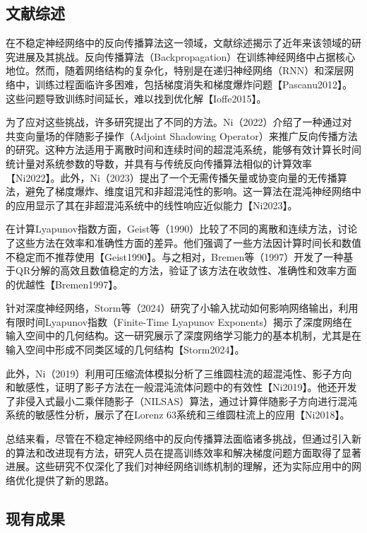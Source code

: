 \documentclass[12pt,a4paper]{amsart}
\begin{document}
\subsection{文献综述}

在不稳定神经网络中的反向传播算法这一领域，文献综述揭示了近年来该领域的研究进展及其挑战。反向传播算法（Backpropagation）在训练神经网络中占据核心地位。然而，随着网络结构的复杂化，特别是在递归神经网络（RNN）和深层网络中，训练过程面临许多困难，包括梯度消失和梯度爆炸问题【Pascanu2012】。这些问题导致训练时间延长，难以找到优化解【Ioffe2015】。

为了应对这些挑战，许多研究提出了不同的方法。Ni（2022）介绍了一种通过对共变向量场的伴随影子操作（Adjoint Shadowing Operator）来推广反向传播方法的研究。这种方法适用于离散时间和连续时间的超混沌系统，能够有效计算长时间统计量对系统参数的导数，并具有与传统反向传播算法相似的计算效率【Ni2022】。此外，Ni（2023）提出了一个无需传播矢量或协变向量的无传播算法，避免了梯度爆炸、维度诅咒和非超混沌性的影响。这一算法在混沌神经网络中的应用显示了其在非超混沌系统中的线性响应近似能力【Ni2023】。

在计算Lyapunov指数方面，Geist等（1990）比较了不同的离散和连续方法，讨论了这些方法在效率和准确性方面的差异。他们强调了一些方法因计算时间长和数值不稳定而不推荐使用【Geist1990】。与之相对，Bremen等（1997）开发了一种基于QR分解的高效且数值稳定的方法，验证了该方法在收敛性、准确性和效率方面的优越性【Bremen1997】。

针对深度神经网络，Storm等（2024）研究了小输入扰动如何影响网络输出，利用有限时间Lyapunov指数（Finite-Time Lyapunov Exponents）揭示了深度网络在输入空间中的几何结构。这一研究展示了深度网络学习能力的基本机制，尤其是在输入空间中形成不同类区域的几何结构【Storm2024】。

此外，Ni（2019）利用可压缩流体模拟分析了三维圆柱流的超混沌性、影子方向和敏感性，证明了影子方法在一般混沌流体问题中的有效性【Ni2019】。他还开发了非侵入式最小二乘伴随影子（NILSAS）算法，通过计算伴随影子方向进行混沌系统的敏感性分析，展示了在Lorenz 63系统和三维圆柱流上的应用【Ni2018】。

总结来看，尽管在不稳定神经网络中的反向传播算法面临诸多挑战，但通过引入新的算法和改进现有方法，研究人员在提高训练效率和解决梯度问题方面取得了显著进展。这些研究不仅深化了我们对神经网络训练机制的理解，还为实际应用中的网络优化提供了新的思路。

\subsection{现有成果}
\end{document}

